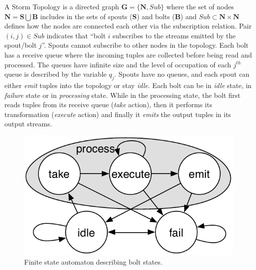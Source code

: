 A Storm Topology is a directed graph $\mathbf{G} = \{ \mathbf{N}, Sub\}$ where the set of nodes $\mathbf{N} = \mathbf{S}\bigcup \mathbf{B}$ includes in the sets of spouts (\textbf{S}) and bolts (\textbf{B}) and %
$Sub\subset\mathbf{N}\times\mathbf{N}$ defines how the nodes are connected each other via the subscription relation. Pair $(i,j)\in Sub$ indicates that ``bolt $i$ subscribes to the streams emitted by the spout/bolt $j$''. 
Spouts cannot subscribe to other nodes in the topology.
Each bolt has a receive queue where the incoming tuples are collected before being read and processed. %
The queues have infinite size and the level of occupation of each $j^{th}$ queue is described by the variable $q_j$. %
Spouts have no queues, and 
each spout can either \textit{emit} tuples into the topology or stay \emph{idle}.
Each bolt can be in \emph{idle} state, in \emph{failure} state or in  \emph{processing} state.  While in the processing state, the bolt first reads tuples from its receive queue (\textit{take} action), then it performs its transformation (\textit{execute} action) and finally it \textit{emits} the output tuples in its output streams. \\
\begin{figure}[tb]
\centering
\includegraphics[width=0.5\linewidth,draft]{images/fig6}
\caption{Finite state automaton describing bolt states.}
\label{figure-fsa}
\end{figure}

